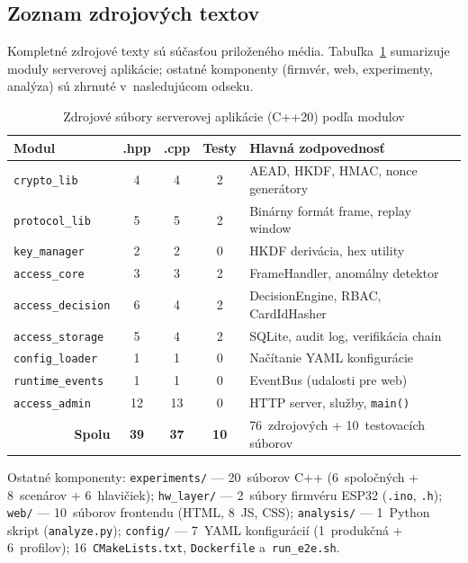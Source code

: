 \documentclass[a4paper]{feidipsp}
\begin{document}
\subsection{Zoznam zdrojových textov}

Kompletné zdrojové texty sú súčasťou priloženého média. Tabuľka~\ref{t:src-server} sumarizuje moduly serverovej aplikácie; ostatné komponenty (firmvér, web, experimenty, analýza) sú zhrnuté v~nasledujúcom odseku.

\begin{table}[!htbp]
\centering
\footnotesize
\renewcommand{\arraystretch}{1.12}
\caption{Zdrojové súbory serverovej aplikácie (C++20) podľa modulov}\label{t:src-server}
\begin{tabular}{|l|c|c|c|p{3.6cm}|} \hline
\textbf{Modul} & \textbf{.hpp} & \textbf{.cpp} & \textbf{Testy} & \textbf{Hlavná zodpovednosť} \\ \hline
\texttt{crypto\_lib}       & 4 & 4 & 2 & AEAD, HKDF, HMAC, nonce generátory \\ \hline
\texttt{protocol\_lib}     & 5 & 5 & 2 & Binárny formát frame, replay window \\ \hline
\texttt{key\_manager}      & 2 & 2 & 0 & HKDF derivácia, hex utility \\ \hline
\texttt{access\_core}      & 3 & 3 & 2 & FrameHandler, anomálny detektor \\ \hline
\texttt{access\_decision}  & 6 & 4 & 2 & DecisionEngine, RBAC, CardIdHasher \\ \hline
\texttt{access\_storage}   & 5 & 4 & 2 & SQLite, audit log, verifikácia chain \\ \hline
\texttt{config\_loader}    & 1 & 1 & 0 & Načítanie YAML konfigurácie \\ \hline
\texttt{runtime\_events}   & 1 & 1 & 0 & EventBus (udalosti pre web) \\ \hline
\texttt{access\_admin}     & 12 & 13 & 0 & HTTP server, služby, \texttt{main()} \\ \hline
\multicolumn{1}{|r|}{\textbf{Spolu}} & \textbf{39} & \textbf{37} & \textbf{10} & 76~zdrojových + 10~testovacích súborov \\ \hline
\end{tabular}
\end{table}

\noindent Ostatné komponenty: \texttt{experiments/} --- 20~súborov C++ (6~spoločných + 8~scenárov + 6~hlavičiek); \texttt{hw\_layer/} --- 2~súbory firmvéru ESP32 (\texttt{.ino}, \texttt{.h}); \texttt{web/} --- 10~súborov frontendu (HTML, 8~JS, CSS); \texttt{analysis/} --- 1~Python skript (\texttt{analyze.py}); \texttt{config/} --- 7~YAML konfigurácií (1~produkčná + 6~profilov); 16~\texttt{CMakeLists.txt}, \texttt{Dockerfile} a~\texttt{run\_e2e.sh}.
\end{document}
